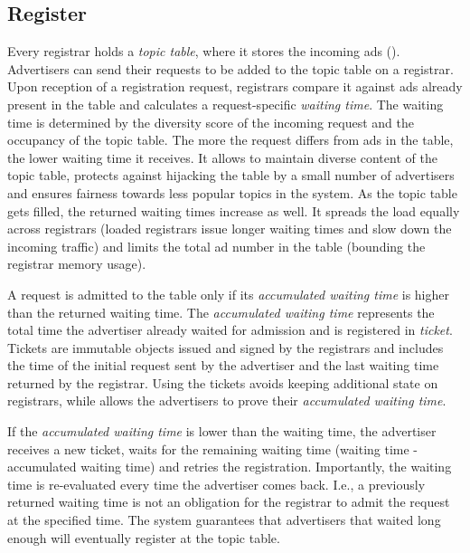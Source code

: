 \iffalse
\subsection{Register}
Every registrar holds a \emph{topic table}, where it stores the incoming ads (). Advertisers can send their requests to be added to the topic table on a registrar. Upon reception of a registration request, registrars compare it against ads already present in the table and calculates a request-specific \emph{waiting time}. The waiting time is determined by the diversity score of the incoming request and the occupancy of the topic table.  The more the request differs from ads in the table, the lower waiting time it receives. It allows to maintain diverse content of the topic table, protects against hijacking the table by a small number of advertisers and ensures fairness towards less popular topics in the system. As the topic table gets filled, the returned waiting times increase as well. It spreads the load equally across registrars (loaded registrars issue longer waiting times and slow down the incoming traffic) and limits the total ad number in the table (bounding the registrar memory usage). 

A request is admitted to the table only if its \emph{accumulated waiting time} is higher than the returned waiting time. The \emph{accumulated waiting time} represents the total time the advertiser already waited for admission and is registered in \emph{ticket}. Tickets are immutable objects issued and signed by the registrars and includes the time of the initial request sent by the advertiser and the last waiting time returned by the registrar. Using the tickets avoids keeping additional state on registrars, while allows the advertisers to prove their \emph{accumulated waiting time}. 

If the \emph{accumulated waiting time} is lower than the waiting time, the advertiser receives a new ticket, waits for the remaining waiting time (waiting time - accumulated waiting time) and retries the registration. Importantly, the waiting time is re-evaluated every time the advertiser comes back. I.e., a previously returned waiting time is not an obligation for the registrar to admit the request at the specified time. The system guarantees that advertisers that waited long enough will eventually register at the topic table. 





